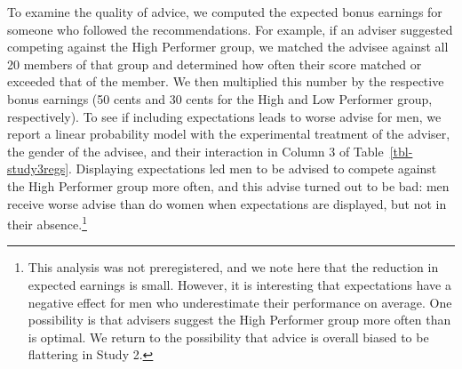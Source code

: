 \documentclass[
  man,
  floatsintext,
  longtable,
  nolmodern,
  notxfonts,
  notimes,
  colorlinks=true,linkcolor=blue,citecolor=blue,urlcolor=blue]{apa7}
\begin{document}
To examine the quality of advice, we computed the expected bonus
earnings for someone who followed the recommendations. For example, if
an adviser suggested competing against the High Performer group, we
matched the advisee against all 20 members of that group and determined
how often their score matched or exceeded that of the member. We then
multiplied this number by the respective bonus earnings (50 cents and 30
cents for the High and Low Performer group, respectively). To see if
including expectations leads to worse advise for men, we report a linear
probability model with the experimental treatment of the adviser, the
gender of the advisee, and their interaction in Column 3 of
Table~\ref{tbl-study3regs}. Displaying expectations led men to be
advised to compete against the High Performer group more often, and this
advise turned out to be bad: men receive worse advise than do women when
expectations are displayed, but not in their absence.\footnote{This
  analysis was not preregistered, and we note here that the reduction in
  expected earnings is small. However, it is interesting that
  expectations have a negative effect for men who underestimate their
  performance on average. One possibility is that advisers suggest the
  High Performer group more often than is optimal. We return to the
  possibility that advice is overall biased to be flattering in Study 2.}
\end{document}
